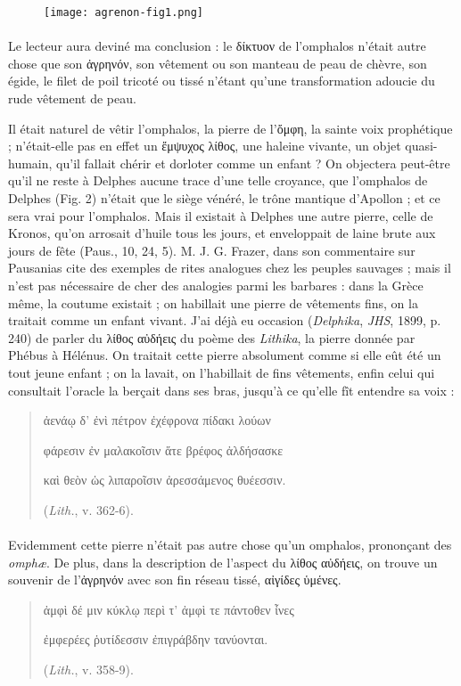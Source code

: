 \documentclass[a4paper, 11pt, oneside, polutonikogreek, french]{article}
\begin{document}
\begin{figure}[ht]
\centering
\texttt{[image: agrenon-fig1.png]}
\end{figure}
\paragraph{}
Le lecteur aura deviné ma conclusion : le δίκτυον de l'omphalos n'était autre chose que son ἀγρηνόν, son vêtement ou son manteau de peau de chèvre, son égide, le filet de poil tricoté ou tissé n'étant qu'une transformation adoucie du rude vêtement de peau.

Il était naturel de vêtir l'omphalos, la pierre de l'ὄμφη, la sainte voix prophétique ; n'était-elle pas en effet un ἔμψυχος λίθος, une haleine vivante, un objet quasi-humain, qu'il fallait chérir et dorloter comme un enfant ? On objectera peut-être qu'il ne reste à Delphes aucune trace d'une telle croyance, que l'omphalos de Delphes (Fig. 2) n'était que le siège vénéré, le trône mantique d'Apollon ; et ce sera vrai pour l'omphalos. Mais il existait à Delphes une autre pierre, celle de Kronos, qu'on arrosait d'huile tous les jours, et enveloppait de laine brute aux jours de fête (Paus., 10, 24, 5). M. J. G. Frazer, dans son commentaire sur Pausanias cite des exemples de rites analogues chez les peuples sauvages ; mais il n'est pas nécessaire de cher des analogies parmi les barbares : dans la Grèce même, la coutume existait ; on habillait une pierre de vêtements fins, on la traitait comme un enfant vivant. J'ai déjà eu occasion (\emph{Delphika}, \emph{JHS}, 1899, p. 240) de parler du λίθος αὐδήεις du poème des \emph{Lithika}, la pierre donnée par Phébus à Hélénus. On traitait cette pierre absolument comme si elle eût été un tout jeune enfant ; on la lavait, on l'habillait de fins vêtements, enfin celui qui consultait l'oracle la berçait dans ses bras, jusqu'à ce qu'elle fît entendre sa voix :
\begin{quotation}
ἀενάῳ δ' ἐνὶ πέτρον ἐχέφρονα πίδακι λούων

φάρεσιν ἐν μαλακοῖσιν ἅτε βρέφος ἀλδήσασκε

καὶ θεὸν ὡς λιπαροῖσιν ἀρεσσάμενος θυέεσσιν.

(\emph{Lith.}, v. 362-6).
\end{quotation}
\paragraph{}
Evidemment cette pierre n'était pas autre chose qu'un omphalos, prononçant des \emph{omphæ}. De plus, dans la description de l'aspect du λίθος αὐδήεις, on trouve un souvenir de l'ἀγρηνόν avec son fin réseau tissé, αἰγίδες ὑμένες.
\begin{quotation}
ἀμφὶ δέ μιν κύκλῳ περὶ τ' ἀμφὶ τε πάντοθεν ἶνες

ἐμφερέες ῥυτίδεσσιν ἐπιγράβδην τανύονται.

(\emph{Lith.}, v. 358-9).
\end{quotation}
\end{document}
